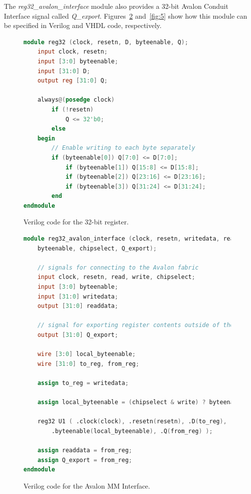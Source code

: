 \documentclass[11pt, twoside, pdftex]{article}
\begin{document}
\noindent
The {\it reg32\_avalon\_interface} module also provides a 32-bit Avalon Conduit Interface 
signal called {\it Q\_export}.  Figures~\ref{fig:3} and~\ref{fig:5} show how this module 
can be specified in Verilog and VHDL code, respectively.

\begin{figure}[!h]
	\begin{lstlisting}[language=Verilog, xleftmargin=3cm]
module reg32 (clock, resetn, D, byteenable, Q);
    input clock, resetn;
    input [3:0] byteenable;
    input [31:0] D;
    output reg [31:0] Q;
		
    always@(posedge clock)
        if (!resetn)
            Q <= 32'b0;
        else
    begin
        // Enable writing to each byte separately
        if (byteenable[0]) Q[7:0] <= D[7:0];
            if (byteenable[1]) Q[15:8] <= D[15:8];
            if (byteenable[2]) Q[23:16] <= D[23:16];
            if (byteenable[3]) Q[31:24] <= D[31:24];
        end
endmodule
		\end{lstlisting}
	\caption{Verilog code for the 32-bit register.}
	\label{fig:2}
\end{figure}

 
\begin{figure}[!h]
	\begin{lstlisting}[language=Verilog, xleftmargin=1cm]
module reg32_avalon_interface (clock, resetn, writedata, readdata, write, read,
    byteenable, chipselect, Q_export);

    // signals for connecting to the Avalon fabric
    input clock, resetn, read, write, chipselect;
    input [3:0] byteenable;
    input [31:0] writedata;
    output [31:0] readdata;

    // signal for exporting register contents outside of the embedded system
    output [31:0] Q_export;

    wire [3:0] local_byteenable;
    wire [31:0] to_reg, from_reg;

    assign to_reg = writedata;

    assign local_byteenable = (chipselect & write) ? byteenable : 4'd0;

    reg32 U1 ( .clock(clock), .resetn(resetn), .D(to_reg), 
        .byteenable(local_byteenable), .Q(from_reg) );

    assign readdata = from_reg;
    assign Q_export = from_reg;
endmodule
		\end{lstlisting}
	\caption{Verilog code for the Avalon MM Interface.}
	\label{fig:3}
\end{figure}
\end{document}
